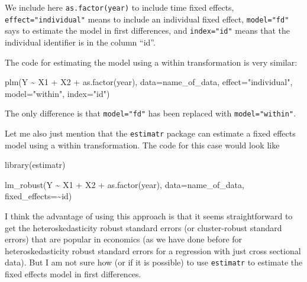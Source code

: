 \documentclass[
  letterpaper,
  DIV=11,
  numbers=noendperiod]{scrreprt}
\newenvironment{Shaded}{\begin{snugshade}}{\end{snugshade}}
\newcommand{\AttributeTok}[1]{\textcolor[rgb]{0.40,0.45,0.13}{#1}}
\newcommand{\FunctionTok}[1]{\textcolor[rgb]{0.28,0.35,0.67}{#1}}
\newcommand{\NormalTok}[1]{\textcolor[rgb]{0.00,0.23,0.31}{#1}}
\newcommand{\SpecialCharTok}[1]{\textcolor[rgb]{0.37,0.37,0.37}{#1}}
\newcommand{\StringTok}[1]{\textcolor[rgb]{0.13,0.47,0.30}{#1}}
\begin{document}
We include here \texttt{as.factor(year)} to include time fixed effects,
\texttt{effect="individual"} means to include an individual fixed
effect, \texttt{model="fd"} says to estimate the model in first
differences, and \texttt{index="id"} means that the individual
identifier is in the column ``id''.

The code for estimating the model using a within transformation is very
similar:

\begin{Shaded}
\begin{Highlighting}[]
\FunctionTok{plm}\NormalTok{(Y }\SpecialCharTok{\textasciitilde{}}\NormalTok{ X1 }\SpecialCharTok{+}\NormalTok{ X2 }\SpecialCharTok{+} \FunctionTok{as.factor}\NormalTok{(year), }
    \AttributeTok{data=}\NormalTok{name\_of\_data,}
    \AttributeTok{effect=}\StringTok{"individual"}\NormalTok{,}
    \AttributeTok{model=}\StringTok{"within"}\NormalTok{,}
    \AttributeTok{index=}\StringTok{"id"}\NormalTok{)}
\end{Highlighting}
\end{Shaded}

The only difference is that \texttt{model="fd"} has been replaced with
\texttt{model="within"}.

Let me also just mention that the \texttt{estimatr} package can estimate
a fixed effects model using a within transformation. The code for this
case would look like

\begin{Shaded}
\begin{Highlighting}[]
\FunctionTok{library}\NormalTok{(estimatr)}

\FunctionTok{lm\_robust}\NormalTok{(Y }\SpecialCharTok{\textasciitilde{}}\NormalTok{ X1 }\SpecialCharTok{+}\NormalTok{ X2 }\SpecialCharTok{+} \FunctionTok{as.factor}\NormalTok{(year), }
          \AttributeTok{data=}\NormalTok{name\_of\_data,}
          \AttributeTok{fixed\_effects=}\SpecialCharTok{\textasciitilde{}}\NormalTok{id)}
\end{Highlighting}
\end{Shaded}

I think the advantage of using this approach is that it seems
straightforward to get the heteroskedasticity robust standard errors (or
cluster-robust standard errors) that are popular in economics (as we
have done before for heteroskedasticity robust standard errors for a
regression with just cross sectional data). But I am not sure how (or if
it is possible) to use \texttt{estimatr} to estimate the fixed effects
model in first differences.
\end{document}
